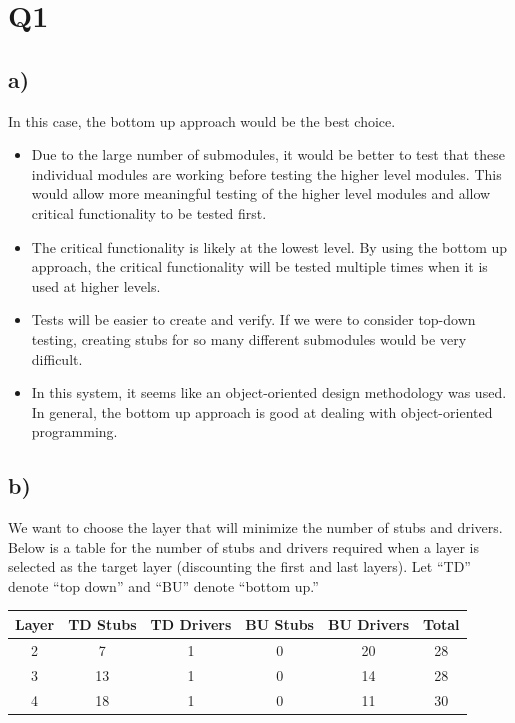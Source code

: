 \documentclass[12pt, letterpaper, titlepage]{article}
\begin{document}
 
\onehalfspacing

\section*{Q1}
\subsection*{a)}
In this case, the bottom up approach would be the best choice. 
\begin{itemize}
    \item Due to the large number of submodules, it would be better to test that these individual modules are working before testing the higher level modules. This would allow more meaningful testing of the higher level modules and allow critical functionality to be tested first.
    \item The critical functionality is likely at the lowest level. By using the bottom up approach, the critical functionality will be tested multiple times when it is used at higher levels.
    \item Tests will be easier to create and verify. If we were to consider top-down testing, creating stubs for so many different submodules would be very difficult. 
    \item In this system, it seems like an object-oriented design methodology was used. In general, the bottom up approach is good at dealing with object-oriented programming.
\end{itemize}

\subsection*{b)}
We want to choose the layer that will minimize the number of stubs and drivers. Below is a table for the number of stubs and drivers required when a layer is selected as the target layer (discounting the first and last layers). Let ``TD'' denote ``top down'' and ``BU'' denote ``bottom up.''

\begin{table}[H]
\begin{tabularx}{\textwidth}{cccccc}
    \toprule
    \textbf{Layer} & \textbf{TD Stubs} & \textbf{TD Drivers} & \textbf{BU Stubs} & \textbf{BU Drivers} & \textbf{Total} \\
    \midrule
    2   & 7   & 1   & 0   & 20  & 28  \\
    3   & 13  & 1   & 0   & 14  & 28  \\
    4   & 18  & 1   & 0   & 11  & 30  \\
    \bottomrule
\end{tabularx}
\end{table}
\end{document}
